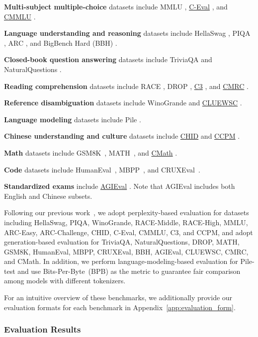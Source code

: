 \textbf{Multi-subject multiple-choice} datasets include MMLU \citep{mmlu}, \underline{C-Eval} \citep{ceval}, and \underline{CMMLU} \citep{cmmlu}.

\textbf{Language understanding and reasoning} datasets include HellaSwag \citep{hellaswag}, PIQA \citep{piqa}, ARC \citep{arc}, and BigBench Hard (BBH) \citep{bbh}.

\textbf{Closed-book question answering} datasets include TriviaQA \citep{joshi-etal-2017-triviaqa} and NaturalQuestions \citep{naturalquestions}.

\textbf{Reading comprehension} datasets include RACE \cite{race}, DROP \citep{drop}, \underline{C3} \citep{sun2019investigating}, and \underline{CMRC} \citep{cui-etal-2019-span}.

\textbf{Reference disambiguation} datasets include WinoGrande \cite{sakaguchi2019winogrande} and \underline{CLUEWSC} \citep{clue}.

\textbf{Language modeling} datasets include Pile \citep{pile}.

\textbf{Chinese understanding and culture} datasets include \underline{CHID} \citep{chid} and \underline{CCPM} \citep{li2021ccpm}.

\textbf{Math} datasets include GSM8K~\citep{gsm8k}, MATH~\citep{hendrycks2021measuring}, and \underline{CMath} \citep{wei2023cmath}.

\textbf{Code} datasets include HumanEval~\citep{codex}, MBPP~\citep{mbpp}, and CRUXEval~\citep{gu2024cruxeval}.

\textbf{Standardized exams} include \underline{AGIEval} \citep{agieval}. Note that AGIEval includes both English and Chinese subsets.

Following our previous work~\citep{deepseek1}, we adopt perplexity-based evaluation for datasets including HellaSwag, PIQA, WinoGrande, RACE-Middle, RACE-High, MMLU, ARC-Easy, ARC-Challenge, CHID, C-Eval, CMMLU, C3, and CCPM, and adopt generation-based evaluation for TriviaQA, NaturalQuestions, DROP, MATH, GSM8K, HumanEval, MBPP, CRUXEval, BBH, AGIEval, CLUEWSC, CMRC, and CMath. In addition, we perform language-modeling-based evaluation for Pile-test and use Bits-Per-Byte~(BPB) as the metric to guarantee fair comparison among models with different tokenizers. 

For an intuitive overview of these benchmarks, we additionally provide our evaluation formats for each benchmark in Appendix~\ref{app:evaluation_form}. 

\subsubsection{Evaluation Results}

